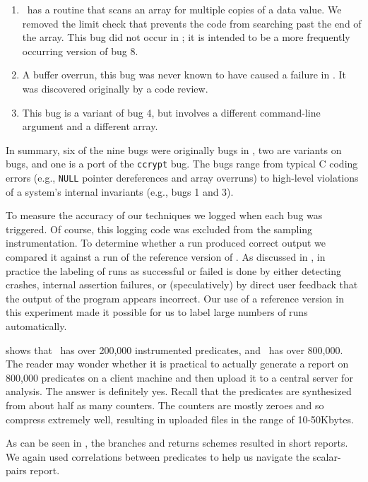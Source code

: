 \begin{enumerate}
\item \moss\ has a routine that scans an array for multiple copies of a data value.
We removed the limit check that prevents the code from searching past the end of the array.  
This bug did not occur in \moss; it is intended to be a more frequently occurring version of bug 8.

\item  A buffer overrun, this bug was never known to have caused a failure in \moss. It
was discovered originally by a code review.

\item This bug is a variant of bug 4, but involves a different command-line argument and
a different array.
\end{enumerate}

In summary, six of the nine bugs were originally bugs in \moss, two are variants on \moss bugs, and one
is a port of the {\tt ccrypt} bug.  The bugs
range from typical C coding errors (e.g., \texttt{NULL} pointer dereferences
and array overruns) to high-level violations of a system's internal
invariants (e.g., bugs 1 and 3).

To measure the accuracy of our techniques we logged 
when each bug was triggered.  Of course, this logging 
code was excluded from the sampling instrumentation.
To determine whether a run produced correct output we compared it against a run
of the reference version of \moss.  As discussed in ,
in practice the labeling of runs as successful or failed is done by either detecting
crashes, internal assertion failures, or (speculatively) by direct user feedback that the output
of the program appears incorrect.  Our use of a reference version in this experiment made
it possible for us to label large numbers of runs automatically.

 shows that \moss\ has over 200,000 instrumented predicates,
and \rhythmbox\ has over 800,000.
The reader may wonder whether it is practical to actually generate a report on
800,000 predicates on a client machine and then upload it to a central
server for analysis.  The answer is definitely yes.  Recall
that the predicates are synthesized from about half as many counters.
The counters are mostly zeroes and so compress extremely well,
resulting in uploaded files in the range of 10-50Kbytes.

As can be seen in , the branches and returns schemes
resulted in short reports.  We again used correlations between predicates to help us navigate
the scalar-pairs report.

